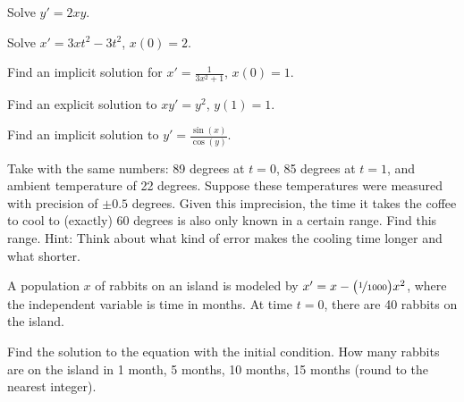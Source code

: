 \begin{exercise}
Solve $y'=2xy$.
\end{exercise}

\begin{exercise}
Solve $x'=3xt^2-3t^2$, $x(0)=2$.
\end{exercise}

\begin{exercise}
Find an implicit solution for
$x'=\frac{1}{3x^2+1}$, $x(0)=1$.
\end{exercise}

\begin{exercise}
Find an explicit solution to $x y' = y^2$, $y(1) = 1$.
\end{exercise}

\begin{exercise}
Find an implicit solution to $y' = \frac{\sin(x)}{\cos(y)}$.
\end{exercise}

\begin{exercise}
Take  with the same numbers: 89 degrees at
$t=0$, 85 degrees at $t=1$, and ambient temperature
of 22 degrees.  Suppose these temperatures were measured with precision of
$\pm 0.5$ degrees.  Given this imprecision, the time
it takes the coffee to cool to (exactly) 60 degrees is also only known in a
certain range.  Find this range.  Hint: Think about what kind of error makes
the cooling time longer and what shorter.
\end{exercise}

\begin{exercise}
A population $x$ of rabbits on an island is modeled by
$x' = x- \bigl(\nicefrac{1}{1000} \bigr) x^2$, where the independent
variable is time in months.  At time $t=0$, there are 40 rabbits
on the island.
\begin{tasks}
\task Find the solution to the equation with the initial
condition.
\task
How many rabbits are on the island in 1 month, 5 months, 
10 months, 15 months (round to the nearest integer).
\end{tasks}
\end{exercise}


